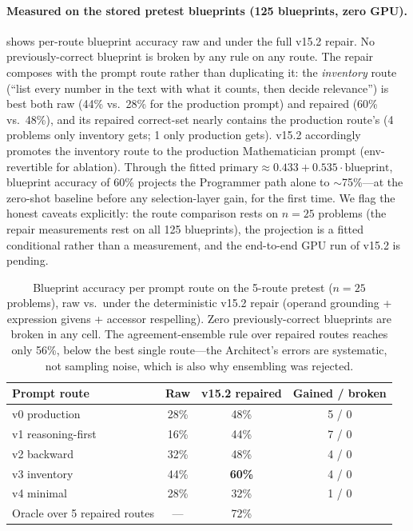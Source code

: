\documentclass[11pt,a4paper]{article}
\begin{document}
\paragraph{Measured on the stored pretest blueprints (125 blueprints, zero GPU).}
 shows per-route blueprint accuracy raw and under the full v15.2 repair.
No previously-correct blueprint is broken by any rule on any route.
The repair composes with the prompt route rather than duplicating it: the \emph{inventory} route (``list every number in the text with what it counts, then decide relevance'') is best both raw (44\% vs.\ 28\% for the production prompt) and repaired (60\% vs.\ 48\%), and its repaired correct-set nearly contains the production route's (4 problems only inventory gets; 1 only production gets).
v15.2 accordingly promotes the inventory route to the production Mathematician prompt (env-revertible for ablation).
Through the fitted $\text{primary} \approx 0.433 + 0.535 \cdot \text{blueprint}$, blueprint accuracy of 60\% projects the Programmer path alone to $\sim$75\%---at the zero-shot baseline before any selection-layer gain, for the first time.
We flag the honest caveats explicitly: the route comparison rests on $n{=}25$ problems (the repair measurements rest on all 125 blueprints), the projection is a fitted conditional rather than a measurement, and the end-to-end GPU run of v15.2 is pending.
\begin{table}[h]
\centering
\caption{Blueprint accuracy per prompt route on the 5-route pretest ($n{=}25$ problems), raw vs.\ under the deterministic v15.2 repair (operand grounding + expression givens + accessor respelling). Zero previously-correct blueprints are broken in any cell. The agreement-ensemble rule over repaired routes reaches only 56\%, below the best single route---the Architect's errors are systematic, not sampling noise, which is also why ensembling was rejected.}
\label{tab:v15_grounding}
\begin{tabular}{lccc}
\toprule
\textbf{Prompt route} & \textbf{Raw} & \textbf{v15.2 repaired} & \textbf{Gained / broken} \\
\midrule
v0 production          & 28\% &  48\% & 5 / 0 \\
v1 reasoning-first     & 16\% &  44\% & 7 / 0 \\
v2 backward            & 32\% &  48\% & 4 / 0 \\
v3 inventory           & 44\% &  \textbf{60\%} & 4 / 0 \\
v4 minimal             & 28\% &  32\% & 1 / 0 \\
\midrule
Oracle over 5 repaired routes & --- & 72\% & \\
\bottomrule
\end{tabular}
\end{table}
\end{document}

